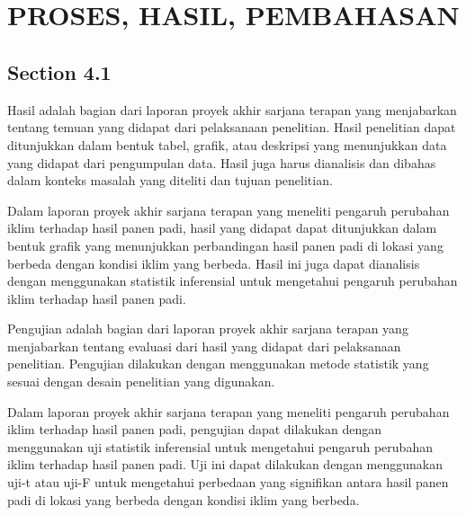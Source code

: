 
\chapter[PROSES, HASIL, PEMBAHASAN]{\\ PROSES, HASIL, PEMBAHASAN}

\section{Section 4.1}
Hasil adalah bagian dari laporan proyek akhir sarjana terapan yang menjabarkan tentang temuan yang didapat dari pelaksanaan penelitian. Hasil penelitian dapat ditunjukkan dalam bentuk tabel, grafik, atau deskripsi yang menunjukkan data yang didapat dari pengumpulan data. Hasil juga harus dianalisis dan dibahas dalam konteks masalah yang diteliti dan tujuan penelitian.

Dalam laporan proyek akhir sarjana terapan yang meneliti pengaruh perubahan iklim terhadap hasil panen padi, hasil yang didapat dapat ditunjukkan dalam bentuk grafik yang menunjukkan perbandingan hasil panen padi di lokasi yang berbeda dengan kondisi iklim yang berbeda. Hasil ini juga dapat dianalisis dengan menggunakan statistik inferensial untuk mengetahui pengaruh perubahan iklim terhadap hasil panen padi.

Pengujian adalah bagian dari laporan proyek akhir sarjana terapan yang menjabarkan tentang evaluasi dari hasil yang didapat dari pelaksanaan penelitian. Pengujian dilakukan dengan menggunakan metode statistik yang sesuai dengan desain penelitian yang digunakan.

Dalam laporan proyek akhir sarjana terapan yang meneliti pengaruh perubahan iklim terhadap hasil panen padi, pengujian dapat dilakukan dengan menggunakan uji statistik inferensial untuk mengetahui pengaruh perubahan iklim terhadap hasil panen padi. Uji ini dapat dilakukan dengan menggunakan uji-t atau uji-F untuk mengetahui perbedaan yang signifikan antara hasil panen padi di lokasi yang berbeda dengan kondisi iklim yang berbeda.

